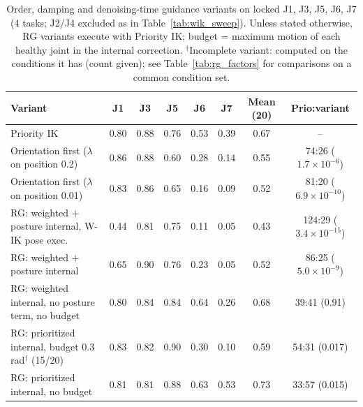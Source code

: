 \begin{table}[t]
\centering
\caption{Order, damping and denoising-time guidance variants on locked J1, J3, J5, J6, J7 (4 tasks; J2/J4 excluded as in Table~\ref{tab:wik_sweep}). Unless stated otherwise, RG variants execute with Priority IK; budget = maximum motion of each healthy joint in the internal correction. $^\dagger$Incomplete variant: computed on the conditions it has (count given); see Table~\ref{tab:rg_factors} for comparisons on a common condition set.}
\label{tab:ablation_ext}
\setlength{\tabcolsep}{3pt}
\begin{tabular}{lccccccc}
\toprule
Variant & J1 & J3 & J5 & J6 & J7 & Mean (20) & Prio:variant \\
\midrule
Priority IK & 0.80 & 0.88 & 0.76 & 0.53 & 0.39 & 0.67 & -- \\
Orientation first ($\lambda$ on position 0.2) & 0.86 & 0.88 & 0.60 & 0.28 & 0.14 & 0.55 & 74:26 ($1.7\times10^{-6}$) \\
Orientation first ($\lambda$ on position 0.01) & 0.83 & 0.86 & 0.65 & 0.16 & 0.09 & 0.52 & 81:20 ($6.9\times10^{-10}$) \\
RG: weighted + posture internal, W-IK pose exec. & 0.44 & 0.81 & 0.75 & 0.11 & 0.05 & 0.43 & 124:29 ($3.4\times10^{-15}$) \\
RG: weighted + posture internal & 0.65 & 0.90 & 0.76 & 0.23 & 0.05 & 0.52 & 86:25 ($5.0\times10^{-9}$) \\
RG: weighted internal, no posture term, no budget & 0.80 & 0.84 & 0.84 & 0.64 & 0.26 & 0.68 & 39:41 (0.91) \\
RG: prioritized internal, budget 0.3 rad$^\dagger$ (15/20) & 0.83 & 0.82 & 0.90 & 0.30 & 0.10 & 0.59 & 54:31 (0.017) \\
RG: prioritized internal, no budget & 0.81 & 0.81 & 0.88 & 0.63 & 0.53 & 0.73 & 33:57 (0.015) \\
\bottomrule
\end{tabular}
\end{table}
